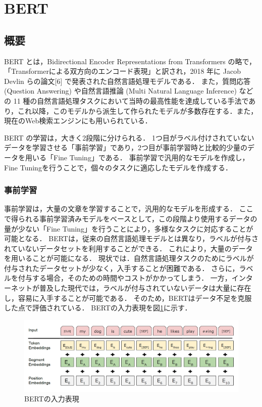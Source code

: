 \section{BERT \label{c4s5}}
\subsection{概要}
BERT とは，Bidirectional Encoder Representations from Transformers の略で， 「Transformerによる双方向のエンコード表現」と訳され，2018 年に Jacob Devlin らの論文[6] で発表された自然言語処理モデルである．
また，質問応答 (Question Answering) や自然言語推論 (Multi Natural Language Inference) などの 11 種の自然言語処理タスクにおいて当時の最高性能を達成している手法であり，これ以降，このモデルから派生して作られたモデルが多数存在する．また，現在のWeb検索エンジンにも用いられている．

BERT の学習は，大きく2段階に分けられる．
1つ目がラベル付けされていないデータを学習させる「事前学習」であり，2つ目が事前学習時と比較的少量のデータを用いる「Fine Tuning」である．
事前学習で汎用的なモデルを作成し，Fine Tuningを行うことで，個々のタスクに適応したモデルを作成する．

\subsubsection{事前学習}
事前学習は，大量の文章を学習することで，汎用的なモデルを形成する．
ここで得られる事前学習済みモデルをベースとして，この段階より使用するデータの量が少ない「Fine Tuning」を行うことにより，多様なタスクに対応することが可能となる．
BERTは，従来の自然言語処理モデルとは異なり，ラベルが付与されていないデータセットを利用することができる．
これにより，大量のデータを用いることが可能になる．
現状では．自然言語処理タスクのためにラベルが付与されたデータセットが少なく，入手することが困難である．
さらに，ラベルを付与する場合，そのための時間やコストがかかってしまう．
一方，インターネットが普及した現代では，ラベルが付与されていないデータは大量に存在し，容易に入手することが可能である．
そのため，BERTはデータ不足を克服した点で評価されている．
BERTの入力表現を図\ref{input}に示す．

\begin{figure}[H]
	\centering
	\includegraphics[width=150mm]{image/BERT-input.png}
	\caption{BERTの入力表現}
	\label{input}
\end{figure}

